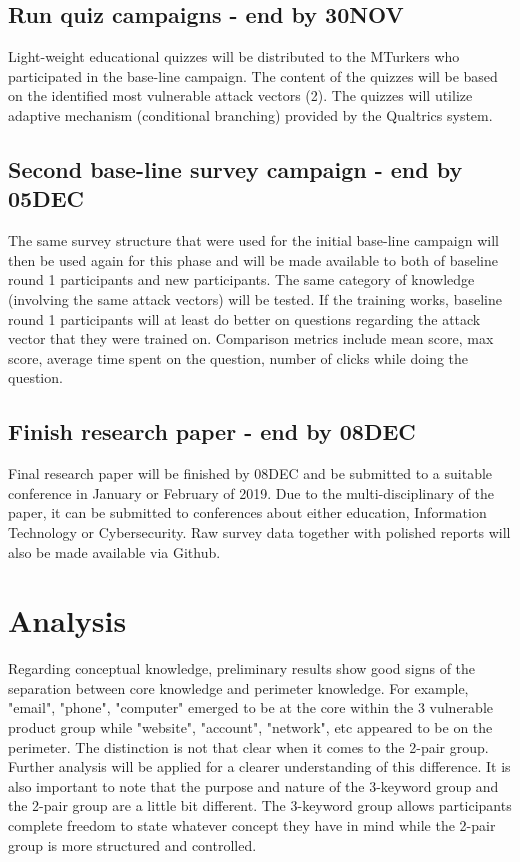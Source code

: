 \documentclass[conference]{IEEEtran}
\begin{document}
\subsection{Run quiz campaigns - end by 30NOV}
Light-weight educational quizzes will be distributed to the MTurkers who participated in the base-line campaign. The content of the quizzes will be based on the identified most vulnerable attack vectors (2). The quizzes will utilize adaptive mechanism (conditional branching) provided by the Qualtrics system. 

\subsection{Second base-line survey campaign - end by 05DEC}
The same survey structure that were used for the initial base-line campaign will then be used again for this phase and will be made available to both of baseline round 1 participants and new participants. The same category of knowledge (involving the same attack vectors) will be tested. If the training works, baseline round 1 participants will at least do better on questions regarding the attack vector that they were trained on. Comparison metrics include mean score, max score, average time spent on the question, number of clicks while doing the question.

\subsection{Finish research paper - end by 08DEC}
Final research paper will be finished by 08DEC and be submitted to a suitable conference in January or February of 2019. Due to the multi-disciplinary of the paper, it can be submitted to conferences about either education, Information Technology or Cybersecurity. Raw survey data together with polished reports will also be made available via Github.

\section{Analysis}
Regarding conceptual knowledge, preliminary results show good signs of the separation between core knowledge and perimeter knowledge. For example, "email", "phone", "computer" emerged to be at the core within the 3 vulnerable product group while "website", "account", "network", etc appeared to be on the perimeter. The distinction is not that clear when it comes to the 2-pair group. Further analysis will be applied for a clearer understanding of this difference. It is also important to note that the purpose and nature of the 3-keyword group and the 2-pair group are a little bit different. The 3-keyword group allows participants complete freedom to state whatever concept they have in mind while the 2-pair group is more structured and controlled.
\end{document}
